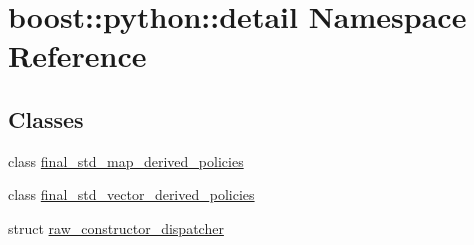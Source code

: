 \hypertarget{namespaceboost_1_1python_1_1detail}{}\section{boost\+:\+:python\+:\+:detail Namespace Reference}
\label{namespaceboost_1_1python_1_1detail}
\subsection*{Classes}
\begin{DoxyCompactItemize}
\item 
class \hyperlink{classboost_1_1python_1_1detail_1_1final__std__map__derived__policies}{final\+\_\+std\+\_\+map\+\_\+derived\+\_\+policies}
\item 
class \hyperlink{classboost_1_1python_1_1detail_1_1final__std__vector__derived__policies}{final\+\_\+std\+\_\+vector\+\_\+derived\+\_\+policies}
\item 
struct \hyperlink{structboost_1_1python_1_1detail_1_1raw__constructor__dispatcher}{raw\+\_\+constructor\+\_\+dispatcher}
\end{DoxyCompactItemize}
